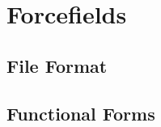 \chapter{Forcefields}

\section{File Format}
\label{sec:ffformat}

\section{Functional Forms}
\label{sec:ffforms}
